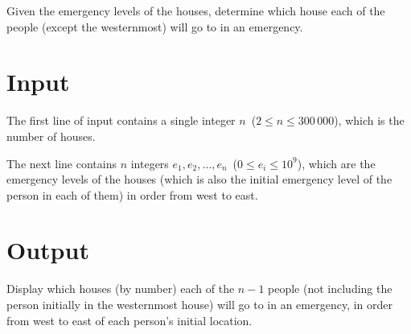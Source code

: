 Given the emergency levels of the houses, determine which house each of the people (except the westernmost) will go to in an emergency.


\section*{Input}

The first line of input contains a single integer $n$~($2 \leq n \leq 300\,000$), which is the number of houses.

The next line contains $n$ integers $e_1, e_2, \dots, e_n$~($0 \leq e_i \leq 10^9$), which are the emergency levels of the houses (which is also the initial emergency level of the person in each of them) in order from west to east.


\section*{Output}

Display which houses (by number) each of the $n-1$ people (not including the person initially in the westernmost house) will go to in an emergency, in order from west to east of each person's initial location.

